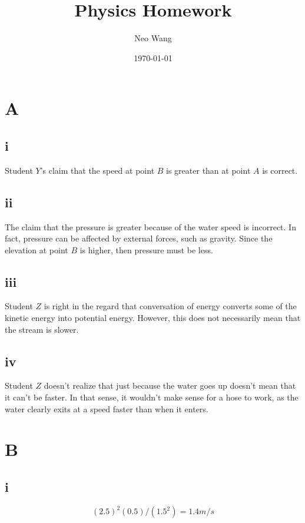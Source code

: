 \documentclass{article}
\title{Physics Homework}
\author{Neo Wang}
\date{\today}
\begin{document}
\maketitle
\tableofcontents

\section{A}

\subsection{i} Student $Y$'s claim that the speed at point $B$ is greater than at point $A$ is correct.

\subsection{ii} The claim that the pressure is greater because of the water speed is incorrect. In fact, pressure can be affected by external forces, such as gravity. Since the elevation at point $B$ is higher, then pressure must be less.

\subsection{iii}

Student $Z$ is right in the regard that conversation of energy converts some of the kinetic energy into potential energy. However, this does not necessarily mean that the stream is slower.

\subsection{iv}

Student $Z$ doesn't realize that just because the water goes up doesn't mean that it can't be faster. In that sense, it wouldn't make sense for a hose to work, as the water clearly exits at a speed faster than when it enters.

\section{B}

\subsection{i}

$$(2.5)^2(0.5)/(1.5^2)=1.4 m/s$$
\end{document}
